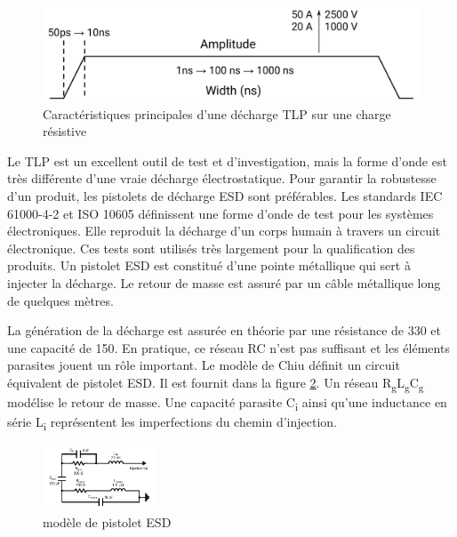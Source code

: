 \begin{figure}[!h]
  \centering
  \includegraphics[width=\textwidth]{src/1/figures/tlp_pulse.pdf}
  \caption{Caractéristiques principales d'une décharge TLP sur une charge résistive}
  \label{tlp_pulse}
\end{figure}

Le TLP est un excellent outil de test et d'investigation, mais la forme d'onde est très différente d'une vraie décharge électrostatique.
Pour garantir la robustesse d'un produit, les pistolets de décharge ESD sont préférables.
Les standards IEC 61000-4-2 \cite{iec61000-4-2} et ISO 10605 \cite{iso10605} définissent une forme d'onde de test pour les systèmes électroniques.
Elle reproduit la décharge d'un corps humain à travers un circuit électronique.
Ces tests sont utilisés très largement pour la qualification des produits.
Un pistolet ESD est constitué d'une pointe métallique qui sert à injecter la décharge.
Le retour de masse est assuré par un câble métallique long de quelques mètres.

La génération de la décharge est assurée en théorie par une résistance de 330\textOmega{} et une capacité de 150.
En pratique, ce réseau RC n'est pas suffisant et les éléments parasites jouent un rôle important.
Le modèle de Chiu \cite{phd-chiu} définit un circuit équivalent de pistolet ESD.
Il est fournit dans la figure \ref{fig:esd-gun-model}.
Un réseau R\textsubscript{g}L\textsubscript{g}C\textsubscript{g} modélise le retour de masse.
Une capacité parasite C\textsubscript{i} ainsi qu'une inductance en série L\textsubscript{i} représentent les imperfections du chemin d'injection.

\begin{figure}[!h]
  \centering
  \includegraphics[width=0.3\textwidth]{src/1/figures/gun_model.pdf}
  \caption{modèle de pistolet ESD}
  \label{fig:esd-gun-model}
\end{figure}

